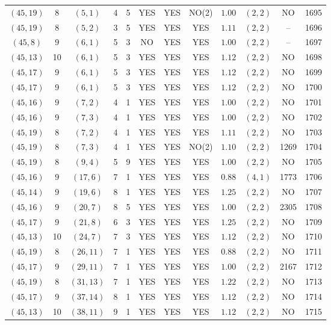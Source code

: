 \begin{longtable}{|c|c|c|c|c|c|c|c|c|c|c|c|}
$(45,19)$ & 8 & $(5,1)$ & 4 & 5 & YES & YES & NO(2) & $1.00$ & $(2,2)$ & NO & 1695\\
$(45,19)$ & 8 & $(5,2)$ & 3 & 5 & YES & YES & YES & $1.11$ & $(2,2)$ & -- & 1696\\
$(45,8)$ & 9 & $(6,1)$ & 5 & 3 & NO & YES & YES & $1.00$ & $(2,2)$ & -- & 1697\\
$(45,13)$ & 10 & $(6,1)$ & 5 & 3 & YES & YES & YES & $1.12$ & $(2,2)$ & NO & 1698\\
$(45,17)$ & 9 & $(6,1)$ & 5 & 3 & YES & YES & YES & $1.12$ & $(2,2)$ & NO & 1699\\
$(45,17)$ & 9 & $(6,1)$ & 5 & 3 & YES & YES & YES & $1.12$ & $(2,2)$ & NO & 1700\\
$(45,16)$ & 9 & $(7,2)$ & 4 & 1 & YES & YES & YES & $1.00$ & $(2,2)$ & NO & 1701\\
$(45,16)$ & 9 & $(7,3)$ & 4 & 1 & YES & YES & YES & $1.00$ & $(2,2)$ & NO & 1702\\
$(45,19)$ & 8 & $(7,2)$ & 4 & 1 & YES & YES & YES & $1.11$ & $(2,2)$ & NO & 1703\\
$(45,19)$ & 8 & $(7,3)$ & 4 & 1 & YES & YES & NO(2) & $1.10$ & $(2,2)$ & 1269 & 1704\\
$(45,19)$ & 8 & $(9,4)$ & 5 & 9 & YES & YES & YES & $1.00$ & $(2,2)$ & NO & 1705\\
$(45,16)$ & 9 & $(17,6)$ & 7 & 1 & YES & YES & YES & $0.88$ & $(4,1)$ & 1773 & 1706\\
$(45,14)$ & 9 & $(19,6)$ & 8 & 1 & YES & YES & YES & $1.25$ & $(2,2)$ & NO & 1707\\
$(45,16)$ & 9 & $(20,7)$ & 8 & 5 & YES & YES & YES & $1.00$ & $(2,2)$ & 2305 & 1708\\
$(45,17)$ & 9 & $(21,8)$ & 6 & 3 & YES & YES & YES & $1.25$ & $(2,2)$ & NO & 1709\\
$(45,13)$ & 10 & $(24,7)$ & 7 & 3 & YES & YES & YES & $1.12$ & $(2,2)$ & NO & 1710\\
$(45,19)$ & 8 & $(26,11)$ & 7 & 1 & YES & YES & YES & $0.88$ & $(2,2)$ & NO & 1711\\
$(45,17)$ & 9 & $(29,11)$ & 7 & 1 & YES & YES & YES & $1.00$ & $(2,2)$ & 2167 & 1712\\
$(45,19)$ & 8 & $(31,13)$ & 7 & 1 & YES & YES & YES & $1.22$ & $(2,2)$ & NO & 1713\\
$(45,17)$ & 9 & $(37,14)$ & 8 & 1 & YES & YES & YES & $1.12$ & $(2,2)$ & NO & 1714\\
$(45,13)$ & 10 & $(38,11)$ & 9 & 1 & YES & YES & YES & $1.12$ & $(2,2)$ & NO & 1715\\

\end{longtable}
